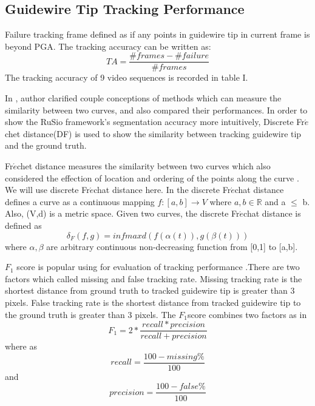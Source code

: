 \documentclass[journal]{IEEEtran}
\begin{document}
\subsection{Guidewire Tip Tracking Performance}
Failure tracking frame defined as if any points in guidewire tip in current frame is beyond PGA. The tracking accuracy can be written as: 
\begin{equation}
TA= \frac{\#frames - \#failure}{\#frames}
\end{equation} 
The tracking accuracy of 9 video sequences is recorded in table I. 

In \cite{Jekel2018Similarity}, author clarified couple conceptions of methods which can measure the similarity between two curves, and also compared their performances. In order to show the RuSio framework’s segmentation accuracy more intuitively, Discrete Fr$\acute{e}$chet distance(DF) is used to show the similarity between tracking guidewire tip and the ground truth.\par
Fr$\acute{e}$chet distance measures the similarity between two curves which also considered the effection of location and ordering of the points along the curve \cite{Eiter1994Computing}. We will use discrete Fr$\acute{e}$chat distance here. In\cite{Eiter1994Computing} the discrete Fr$\acute{e}$chat distance defines a curve as a continuous mapping $f:[a,b] \rightarrow V$ where $a,b  \in  \mathbb{R}$ and a $\leq$ b. Also, (V,d) is a metric space. Given two curves, the discrete Fr$\acute{e}$chat distance is defined as 
\begin{equation}
\delta_F(f,g) =  infmaxd(f(\alpha(t)),g(\beta(t)))
\end{equation}
where $\alpha, \beta$ are arbitrary continuous non-decreasing function from [0,1] to [a,b].\par

$F_{1}$ score is popular using for evaluation of tracking performance \cite{vandini2017robust}\cite{Peng2009Robust}\cite{6671560} .There are two factors which called missing and false tracking rate.
Missing tracking rate is the shortest distance from ground truth to tracked guidewire tip is greater than 3 pixels. 
False tracking rate is the shortest distance from tracked guidewire tip to the ground truth is greater than 3 pixels.
The $F_{1}$score combines two factors as in \cite{vandini2017robust}\cite{6671560}
\begin{equation}
F_{1} = 2*\frac{recall*precision}{recall+precision}
\end{equation}
where as 
\begin{equation}
recall = \frac{100-missing\%}{100}
\end{equation}
and
\begin{equation}
precision = \frac{100-false\%}{100}
\end{equation}
\end{document}

